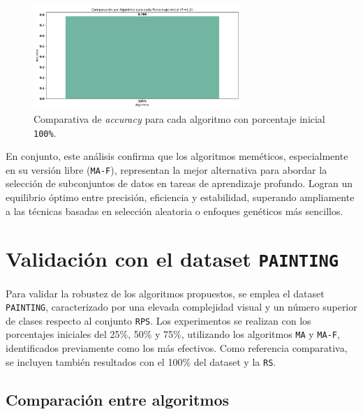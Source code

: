 \begin{figure}[htp]
    \centering
    \includegraphics[width=0.7\textwidth]{imagenes/evaluaciones/final/barplot-por-pi/pi-100.png}
    \caption{Comparativa de \textit{accuracy} para cada algoritmo con porcentaje inicial \texttt{100\%}.}
    \label{fig:barplot-por-pi-100}
\end{figure}

En conjunto, este análisis confirma que los algoritmos meméticos, especialmente en su versión libre (\texttt{MA-F}),
representan la mejor alternativa para abordar la selección de subconjuntos de datos en tareas de aprendizaje profundo.
Logran un equilibrio óptimo entre precisión, eficiencia y estabilidad, superando ampliamente a las técnicas basadas en selección aleatoria o enfoques genéticos más sencillos.


\section{Validación con el dataset \texttt{PAINTING}}\label{sec:validacion-con-painting}
Para validar la robustez de los algoritmos propuestos, se emplea el dataset \texttt{PAINTING},
caracterizado por una elevada complejidad visual y un número superior de clases respecto al conjunto \texttt{RPS}.
Los experimentos se realizan con los porcentajes iniciales del 25\%, 50\% y 75\%, utilizando los algoritmos \texttt{MA} y \texttt{MA-F}, identificados previamente como los más efectivos.
Como referencia comparativa, se incluyen también resultados con el 100\% del dataset y la \texttt{RS}.

\subsection{Comparación entre algoritmos}

